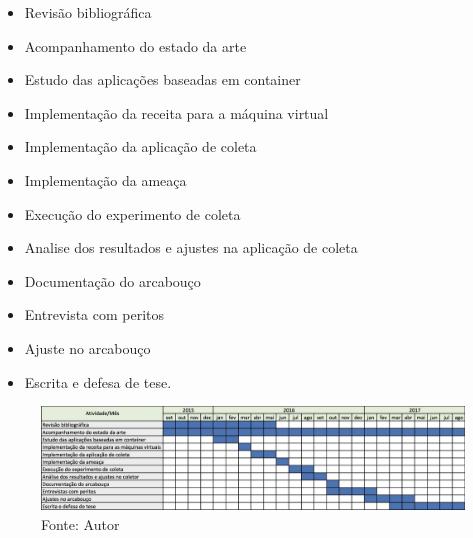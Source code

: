\documentclass[12pt,				%
	openright,			%
	oneside,			%
	a4paper,			%
	english,			%
	brazil				%
	]{abntex2}
\begin{document}
\begin{itemize}
 \item Revisão bibliográfica
 \item Acompanhamento do estado da arte
 \item Estudo das aplicações baseadas em container
 \item Implementação da receita para a máquina virtual
 \item Implementação da aplicação de coleta
 \item Implementação da ameaça
 \item Execução do experimento de coleta
 \item Analise dos resultados e ajustes na aplicação de coleta
 \item Documentação do arcabouço
 \item Entrevista com peritos
 \item Ajuste no arcabouço
 \item Escrita e defesa de tese.
\end{itemize}

\begin{figure}
\includegraphics[keepaspectratio, scale=0.26]{Cronograma}
\caption{Fonte: Autor}
\end{figure}



\postextual

%  

\end{document}
